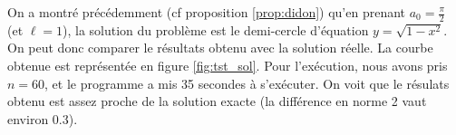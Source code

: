 \documentclass[10pt,a4paper]{article}
\theoremstyle{plain}
\theoremstyle{definition}
\begin{document}
\vspace*{\baselineskip}

On a montré précédemment (cf proposition \ref{prop:didon}) qu'en prenant $a_0=\frac{\pi}{2}$ (et $\ell=1$), la solution du problème est le demi-cercle d'équation $y=\sqrt{1-x^2}$. On peut donc comparer le résultats obtenu avec la solution réelle. La courbe obtenue est représentée en figure \ref{fig:tst_sol}. Pour l'exécution, nous avons pris $n=60$, et le programme a mis 35 secondes à s'exécuter. On voit que le résulats obtenu est assez proche de la solution exacte (la différence en norme 2 vaut environ 0.3).

\begin{figure}
	\centering
\end{figure}
\end{document}
